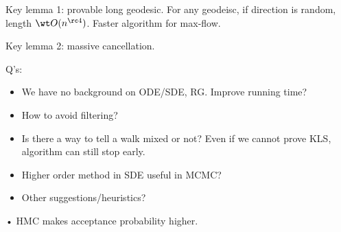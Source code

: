 Key lemma 1: provable long geodesic. For any geodeisc, if direction is random, length $\wt O(n^{\rc 4})$. Faster algorithm for max-flow.

Key lemma 2: massive cancellation. 

Q's: 
\begin{itemize}
\item
We have no background on ODE/SDE, RG. Improve running time?
\item
How to avoid filtering?
\item
Is there a way to tell a walk mixed or not? Even if we cannot prove KLS, algorithm can still stop early.
\item
Higher order method in SDE useful in MCMC?
\item
Other suggestions/heuristics?
\end{itemize}•
HMC makes acceptance probability higher.

